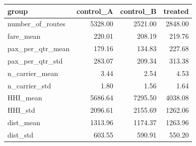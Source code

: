 \begin{tabular}{lrrr}
\toprule
group & control_A & control_B & treated \\
\midrule
number_of_routes & 5328.00 & 2521.00 & 2848.00 \\
fare_mean & 220.01 & 208.19 & 219.76 \\
pax_per_qtr_mean & 179.16 & 134.83 & 227.68 \\
pax_per_qtr_std & 283.07 & 209.34 & 313.38 \\
n_carrier_mean & 3.44 & 2.54 & 4.53 \\
n_carrier_std & 1.80 & 1.56 & 1.64 \\
HHI_mean & 5686.64 & 7295.50 & 4038.08 \\
HHI_std & 2096.61 & 2155.69 & 1262.06 \\
dist_mean & 1313.96 & 1174.37 & 1263.96 \\
dist_std & 603.55 & 590.91 & 550.20 \\
\bottomrule
\end{tabular}
